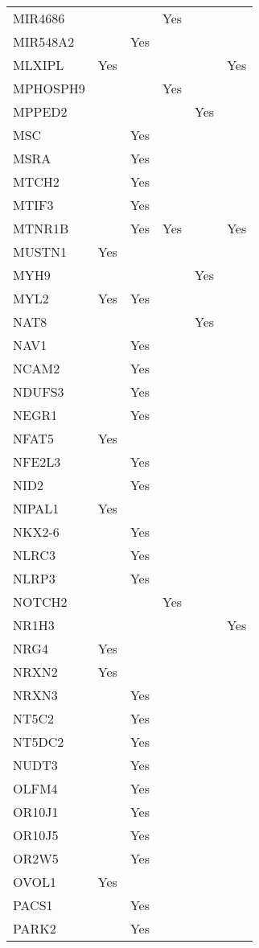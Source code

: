 \documentclass[twoside,openright]{report}
\begin{document}
\begin{appendices}
\begin{longtable}[t]{llllll}
MIR4686 &  &  & Yes &  & \\
MIR548A2 &  & Yes &  &  & \\
MLXIPL & Yes &  &  &  & Yes\\
MPHOSPH9 &  &  & Yes &  & \\
MPPED2 &  &  &  & Yes & \\
MSC &  & Yes &  &  & \\
MSRA &  & Yes &  &  & \\
MTCH2 &  & Yes &  &  & \\
MTIF3 &  & Yes &  &  & \\
MTNR1B &  & Yes & Yes &  & Yes\\
MUSTN1 & Yes &  &  &  & \\
MYH9 &  &  &  & Yes & \\
MYL2 & Yes & Yes &  &  & \\
NAT8 &  &  &  & Yes & \\
NAV1 &  & Yes &  &  & \\
NCAM2 &  & Yes &  &  & \\
NDUFS3 &  & Yes &  &  & \\
NEGR1 &  & Yes &  &  & \\
NFAT5 & Yes &  &  &  & \\
NFE2L3 &  & Yes &  &  & \\
NID2 &  & Yes &  &  & \\
NIPAL1 & Yes &  &  &  & \\
NKX2-6 &  & Yes &  &  & \\
NLRC3 &  & Yes &  &  & \\
NLRP3 &  & Yes &  &  & \\
NOTCH2 &  &  & Yes &  & \\
NR1H3 &  &  &  &  & Yes\\
NRG4 & Yes &  &  &  & \\
NRXN2 & Yes &  &  &  & \\
NRXN3 &  & Yes &  &  & \\
NT5C2 &  & Yes &  &  & \\
NT5DC2 &  & Yes &  &  & \\
NUDT3 &  & Yes &  &  & \\
OLFM4 &  & Yes &  &  & \\
OR10J1 &  & Yes &  &  & \\
OR10J5 &  & Yes &  &  & \\
OR2W5 &  & Yes &  &  & \\
OVOL1 & Yes &  &  &  & \\
PACS1 &  & Yes &  &  & \\
PARK2 &  & Yes &  &  & \\

\end{longtable}
\end{appendices}
\end{document}
